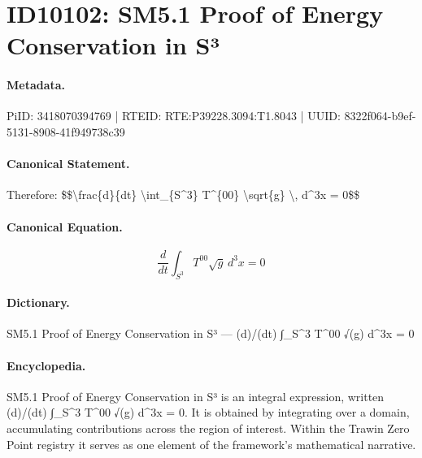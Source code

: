 \section*{ID10102: SM5.1 Proof of Energy Conservation in S³}
\paragraph{Metadata.}
PiID: 3418070394769 | RTEID: RTE:P39228.3094:T1.8043 | UUID: 8322f064-b9ef-5131-8908-41f949738c39

\paragraph{Canonical Statement.}
Therefore: \$\$\textbackslash{}frac\{d\}\{dt\} \textbackslash{}int\_\{S\textasciicircum{}3\} T\textasciicircum{}\{00\} \textbackslash{}sqrt\{g\} \textbackslash{}, d\textasciicircum{}3x = 0\$\$

\paragraph{Canonical Equation.}
\[
\frac{d}{dt} \int_{S^3} T^{00} \sqrt{g} \, d^3x = 0
\]

\paragraph{Dictionary.}
SM5.1 Proof of Energy Conservation in S³ — (d)/(dt) ∫\_S\textasciicircum{}3 T\textasciicircum{}00 √(g) d\textasciicircum{}3x = 0

\paragraph{Encyclopedia.}
SM5.1 Proof of Energy Conservation in S³ is an integral expression, written (d)/(dt) ∫\_S\textasciicircum{}3 T\textasciicircum{}00 √(g) d\textasciicircum{}3x = 0. It is obtained by integrating over a domain, accumulating contributions across the region of interest. Within the Trawin Zero Point registry it serves as one element of the framework's mathematical narrative.
